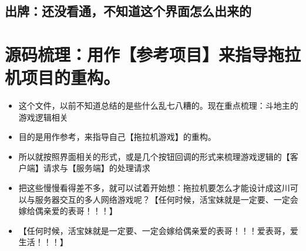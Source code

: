 \documentclass[9pt, b5paper]{article}
\begin{document}
\subsection{出牌：还没看通，不知道这个界面怎么出来的}
\label{sec-3-4}
\section{源码梳理：用作【参考项目】来指导拖拉机项目的重构。}
\label{sec-4}
\begin{itemize}
\item 这个文件，以前不知道总结的是些什么乱七八糟的。现在重点梳理：斗地主的游戏逻辑相关
\item 目的是用作参考，来指导自己【拖拉机游戏】的重构。
\item 所以就按照界面相关的形式，或是几个按钮回调的形式来梳理游戏逻辑的【客户端】请求与【服务端】的处理请求
\item 把这些慢慢看得差不多，就可以试着开始想：拖拉机要怎么才能设计成这川可以与服务器交互的多人网络游戏呢？【任何时候，活宝妹就是一定要、一定会嫁给偶亲爱的表哥！！！】
\item 【任何时候，活宝妹就是一定要、一定会嫁给偶亲爱的表哥！！！爱表哥，爱生活！！！】
\end{itemize}
\end{document}
